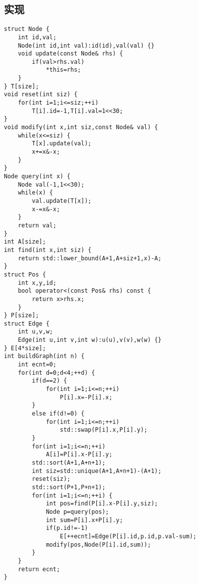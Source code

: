 \subsection{实现}
\begin{lstlisting}
struct Node {
    int id,val;
    Node(int id,int val):id(id),val(val) {}
    void update(const Node& rhs) {
        if(val>rhs.val)
            *this=rhs;
    }
} T[size];
void reset(int siz) {
    for(int i=1;i<=siz;++i)
        T[i].id=-1,T[i].val=1<<30;
}
void modify(int x,int siz,const Node& val) {
    while(x<=siz) {
        T[x].update(val);
        x+=x&-x;
    }
}
Node query(int x) {
    Node val(-1,1<<30);
    while(x) {
        val.update(T[x]);
        x-=x&-x;
    }
    return val;
}
int A[size];
int find(int x,int siz) {
    return std::lower_bound(A+1,A+siz+1,x)-A;
}
struct Pos {
    int x,y,id;
    bool operator<(const Pos& rhs) const {
        return x>rhs.x;
    }
} P[size];
struct Edge {
    int u,v,w;
    Edge(int u,int v,int w):u(u),v(v),w(w) {}
} E[4*size];
int buildGraph(int n) {
    int ecnt=0;
    for(int d=0;d<4;++d) {
        if(d==2) {
            for(int i=1;i<=n;++i)
                P[i].x=-P[i].x;
        }
        else if(d!=0) {
            for(int i=1;i<=n;++i)
                std::swap(P[i].x,P[i].y);
        }
        for(int i=1;i<=n;++i)
            A[i]=P[i].x-P[i].y;
        std::sort(A+1,A+n+1);
        int siz=std::unique(A+1,A+n+1)-(A+1);
        reset(siz);
        std::sort(P+1,P+n+1);
        for(int i=1;i<=n;++i) {
            int pos=find(P[i].x-P[i].y,siz);
            Node p=query(pos);
            int sum=P[i].x+P[i].y;
            if(p.id!=-1)
                E[++ecnt]=Edge(P[i].id,p.id,p.val-sum);
            modify(pos,Node(P[i].id,sum));
        }
    }
    return ecnt;
}
\end{lstlisting}
